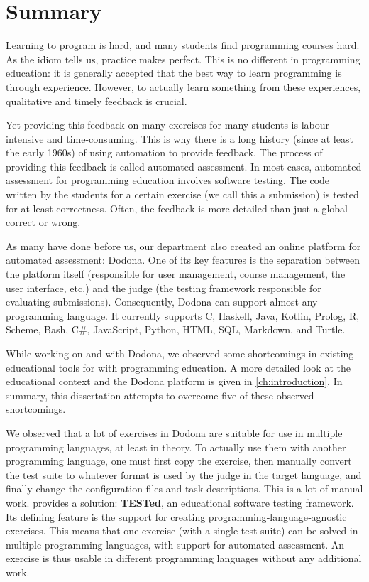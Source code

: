 \documentclass[main]{subfiles}
\begin{document}
\chapter{Summary}\label{ch:summary}

Learning to program is hard, and many students find programming courses hard.
As the idiom tells us, practice makes perfect.
This is no different in programming education: it is generally accepted that the best way to learn programming is through experience.
However, to actually learn something from these experiences, qualitative and timely feedback is crucial.

Yet providing this feedback on many exercises for many students is labour-intensive and time-consuming.
This is why there is a long history (since at least the early 1960s) of using automation to provide feedback.
The process of providing this feedback is called automated assessment.
In most cases, automated assessment for programming education involves software testing.
The code written by the students for a certain exercise (we call this a submission) is tested for at least correctness.
Often, the feedback is more detailed than just a global correct or wrong.

As many have done before us, our department also created an online platform for automated assessment: Dodona.
One of its key features is the separation between the platform itself (responsible for user management, course management, the user interface, etc.) and the judge (the testing framework responsible for evaluating submissions).
Consequently, Dodona can support almost any programming language.
It currently supports C, Haskell, Java, Kotlin, Prolog, R, Scheme, Bash, C\#, JavaScript, Python, HTML, SQL, Markdown, and Turtle.

While working on and with Dodona, we observed some shortcomings in existing educational tools for with programming education.
A more detailed look at the educational context and the Dodona platform is given in \cref{ch:introduction}.
In summary, this dissertation attempts to overcome five of these observed shortcomings.

We observed that a lot of exercises in Dodona are suitable for use in multiple programming languages, at least in theory.
To actually use them with another programming language, one must first copy the exercise, then manually convert the test suite to whatever format is used by the judge in the target language, and finally change the configuration files and task descriptions.
This is a lot of manual work.
 provides a solution: \textbf{TESTed}, an educational software testing framework.
Its defining feature is the support for creating programming‐language‐agnostic exercises.
This means that one exercise (with a single test suite) can be solved in multiple programming languages, with support for automated assessment.
An exercise is thus usable in different programming languages without any additional work.
\end{document}
